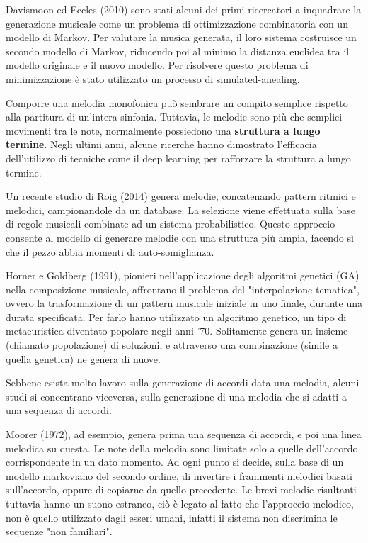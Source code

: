 \documentclass[a4paper,12pt]{report}
\begin{document}
Davismoon ed Eccles (2010) sono stati alcuni dei primi ricercatori a inquadrare la generazione musicale come un problema di ottimizzazione combinatoria con un modello di Markov. 
Per valutare la musica generata, il loro sistema costruisce un secondo modello di Markov, riducendo poi al minimo la distanza euclidea tra il modello originale e il nuovo modello. 
Per risolvere questo problema di minimizzazione è stato utilizzato un processo di simulated-anealing.

Comporre una melodia monofonica può sembrare un compito semplice rispetto alla partitura di un'intera sinfonia. 
Tuttavia, le melodie sono più che semplici movimenti tra le note, normalmente possiedono una \textbf{struttura a lungo termine}. 
Negli ultimi anni, alcune ricerche hanno dimostrato l’efficacia dell’utilizzo di tecniche come il deep learning per rafforzare la struttura a lungo termine.

Un recente studio di Roig (2014) genera melodie, concatenando pattern ritmici e melodici, campionandole da un database. 
La selezione viene effettuata sulla base di regole musicali combinate ad un sistema probabilistico. 
Questo approccio consente al modello di generare melodie con una struttura più ampia, facendo sì che il pezzo abbia momenti di auto-somiglianza.

Horner e Goldberg (1991), pionieri nell'applicazione degli algoritmi genetici (GA) nella composizione musicale, affrontano il problema del "interpolazione tematica", ovvero la trasformazione di un pattern musicale iniziale in uno finale, durante una durata specificata. 
Per farlo hanno utilizzato un algoritmo genetico, un tipo di metaeuristica diventato popolare negli anni '70. 
Solitamente genera un insieme (chiamato popolazione) di soluzioni, e attraverso una combinazione (simile a quella genetica) ne genera di nuove.

Sebbene esista molto lavoro sulla generazione di accordi data una melodia, alcuni studi si concentrano viceversa, sulla generazione di una melodia che si adatti a una sequenza di accordi.

Moorer (1972), ad esempio, genera prima una sequenza di accordi, e poi una linea melodica su questa.
Le note della melodia sono limitate solo a quelle dell'accordo corrispondente in un dato momento. 
Ad ogni punto si decide, sulla base di un modello markoviano del secondo ordine, di invertire i frammenti melodici basati sull'accordo, oppure di copiarne da quello precedente.
Le brevi melodie risultanti tuttavia hanno un suono estraneo, ciò è legato al fatto che l'approccio melodico, non è quello utilizzato dagli esseri umani, infatti il sistema non discrimina le sequenze "non familiari".
\end{document}
